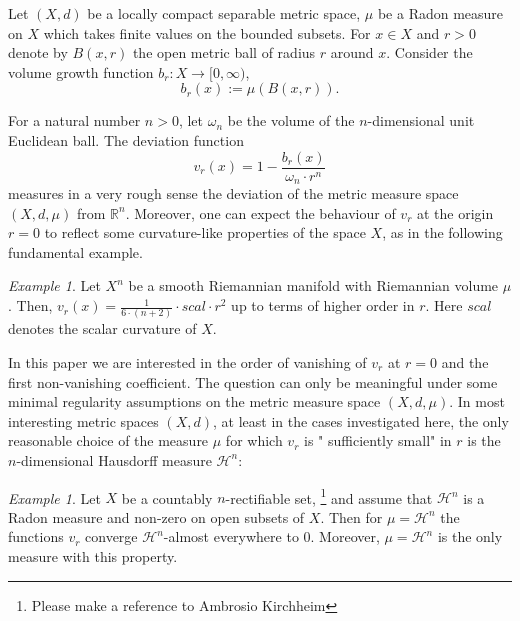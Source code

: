 \documentclass[12pt,leqno,intlimits]{amsart}
\numberwithin{equation}{section}
\theoremstyle{definition}
\theoremstyle{remark}
\newtheorem{ex}[thm]{Example}
\newcommand{\R}{\mathbb{R}}
\def\:{\colon}
\begin{document}
Let $(X,d)$ be a locally compact separable metric space,
$\mu$ be a Radon measure on $X$ which takes finite values on the bounded subsets.
{\color{green} For $x\in X$ and $r>0$
denote by $B(x,r)$ the open metric ball of radius $r$ around $x$. Consider the  volume growth function}  $b_r\:X\to [0,\infty )$,
\begin{equation}
b_r(x):=\mu (B(x,r)).
\end{equation}
{\color  {green} For a natural number $n>0$,  let $\omega _n$ be the volume of the $n$-dimensional unit Euclidean ball. The  deviation function
$$v_r (x)=1 - \frac {b_r (x)} { \omega _n{\cdot}r^n} $$
measures in a very rough sense the deviation of the metric measure space $(X,d,\mu)$ from $\R^n$.  Moreover, one can expect the behaviour of $v_r$ at the origin $r=0$ to reflect some curvature-like properties of the space $X$, as in the following fundamental example.

\begin{ex} \label{smoothscal}
Let $X^n$ be a smooth Riemannian manifold with Riemannian volume $\mu$. Then, $v_r (x)= \frac 1 {6\cdot(n+2)}\cdot scal \cdot r^2$ up to terms of higher order in $r$.  Here $scal$ denotes the scalar curvature of $X$.
\end{ex}

In this paper we are interested in the order of vanishing of $v_r$ at $r=0$  and the first non-vanishing coefficient. The question
 can only be meaningful under  some minimal regularity assumptions on the metric measure space $(X,d,\mu)$.  In most interesting metric spaces $(X,d)$, at least in the cases investigated here, the only reasonable choice of the measure $\mu$ for which $v_r$ is " sufficiently small" in $r$ is the $n$-dimensional Hausdorff measure $\mathcal H^n$:
 
 \begin{ex}      \label{ex:rect}
 Let $X$ be  a countably $n$-rectifiable set, \footnote{Please make a reference to {Ambrosio Kirchheim}}
 and assume that $\mathcal H^n$ is a Radon measure and   non-zero on open subsets of $X$.
 Then for $\mu =\mathcal H^n$ the functions $v_r$ converge $\mathcal H^n$-almost everywhere to $0$. Moreover, $\mu=\mathcal H^n$  is the only measure  with this property. 
 \end{ex}
 
}
\end{document}
